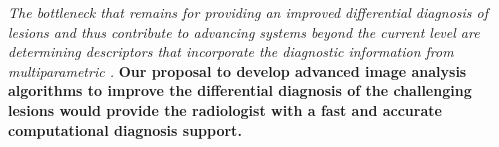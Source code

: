 




\emph{The bottleneck that remains for providing an improved differential
diagnosis of \nmle lesions and thus contribute to advancing
\cad systems beyond the current level are determining descriptors that
incorporate the diagnostic information from multiparametric \mri.}
\textbf{Our proposal to develop advanced image analysis algorithms to improve
the differential diagnosis of the challenging \nmle lesions
would provide the radiologist with a fast and accurate computational diagnosis
support.}


